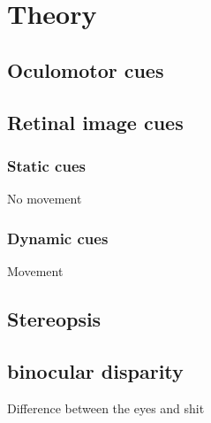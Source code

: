 \chapter{Theory}
	
	\section{Oculomotor cues}
	
	\section{Retinal image cues}
		\subsection{Static cues}
			No movement
		\subsection{Dynamic cues}
			Movement
	\section{Stereopsis}
		
	
	\section{binocular disparity}
		Difference between the eyes and shit